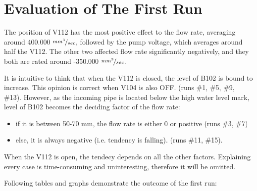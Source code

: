 \newpage
\section{Evaluation of The First Run}

The position of V112 has the most positive effect to the flow rate, averaging around 400.000 $\nicefrac{mm^3}{sec}$, followed by the pump voltage, which averages around half the V112. The other two affected flow rate significantly negatively, and they both are rated around -350.000 $\nicefrac{mm^3}{sec}$.

It is intuitive to think that when the V112 is closed, the level of B102 is bound to increase. This opinion is correct when V104 is also OFF. (runs \#1, \#5, \#9, \#13). However, as the incoming pipe is located below the high water level mark, level of B102 becomes the deciding factor of the flow rate:

\begin{itemize}[noitemsep, topsep=0pt]
\item if it is between 50-70 mm, the flow rate is either 0 or positive (runs \#3, \#7)
\item else, it is always negative (i.e. tendency is falling). (runs \#11, \#15).
\end{itemize}

When the V112 is open, the tendecy depends on all the other factors. Explaining every case is time-consuming and uninteresting, therefore it will be omitted.

Following tables and graphs demonstrate the outcome of the first run:

